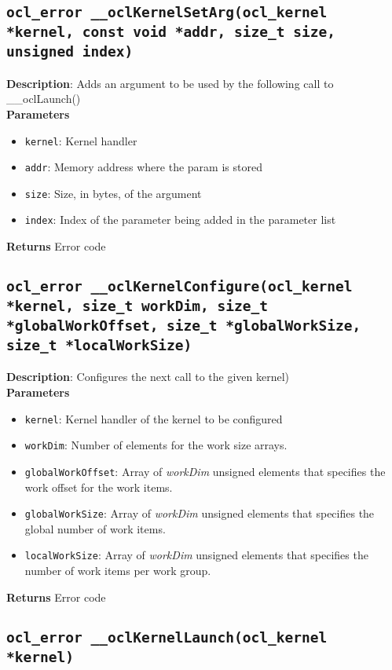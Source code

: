 \subsection{\texttt{ocl\_error \_\_oclKernelSetArg(ocl\_kernel *kernel, const void *addr, size\_t size, unsigned index)}}

\textbf{Description}: Adds an argument to be used by the following call to \_\_oclLaunch()\\
\textbf{Parameters}
\begin{itemize}
  \item \texttt{kernel}: Kernel handler
  \item \texttt{addr}: Memory address where the param is stored
  \item \texttt{size}: Size, in bytes, of the argument
  \item \texttt{index}: Index of the parameter being added in the parameter list
\end{itemize}
\textbf{Returns} Error code


\subsection{\texttt{ocl\_error \_\_oclKernelConfigure(ocl\_kernel *kernel, size\_t workDim, size\_t *globalWorkOffset, size\_t *globalWorkSize, size\_t *localWorkSize)}}

\textbf{Description}: Configures the next call to the given kernel) \\
\textbf{Parameters}
\begin{itemize}
  \item \texttt{kernel}: Kernel handler of the kernel to be configured
  \item \texttt{workDim}: Number of elements for the work size arrays.
  \item \texttt{globalWorkOffset}: Array of \emph{workDim} unsigned elements that specifies the work 
    offset for the work items.
  \item \texttt{globalWorkSize}: Array of \emph{workDim} unsigned elements that specifies the global 
    number of work items.
  \item \texttt{localWorkSize}: Array of \emph{workDim} unsigned elements that specifies the number 
    of work items per work group.
\end{itemize}
\textbf{Returns} Error code

\subsection{\texttt{ocl\_error \_\_oclKernelLaunch(ocl\_kernel *kernel)}}

